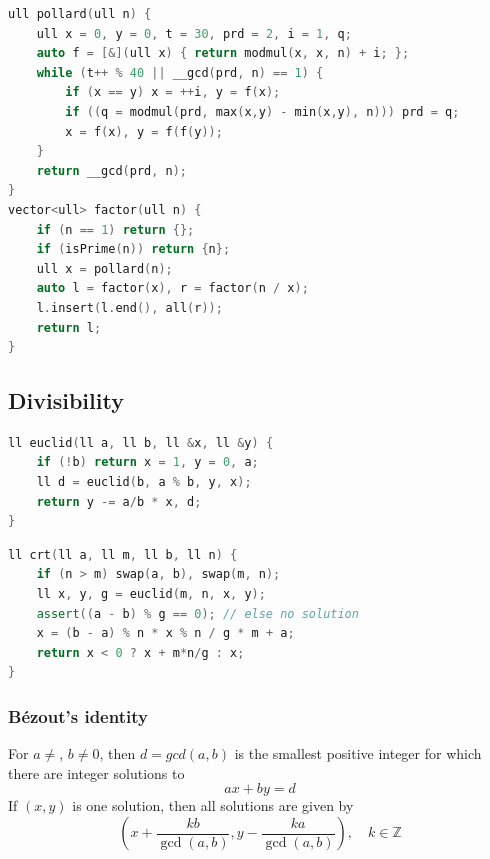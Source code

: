 \begin{multicols}{\Columns}
\begin{lstlisting}[language=C++]
ull pollard(ull n) {
	ull x = 0, y = 0, t = 30, prd = 2, i = 1, q;
	auto f = [&](ull x) { return modmul(x, x, n) + i; };
	while (t++ % 40 || __gcd(prd, n) == 1) {
		if (x == y) x = ++i, y = f(x);
		if ((q = modmul(prd, max(x,y) - min(x,y), n))) prd = q;
		x = f(x), y = f(f(y));
	}
	return __gcd(prd, n);
}
vector<ull> factor(ull n) {
	if (n == 1) return {};
	if (isPrime(n)) return {n};
	ull x = pollard(n);
	auto l = factor(x), r = factor(n / x);
	l.insert(l.end(), all(r));
	return l;
}
\end{lstlisting}


\subsection{Divisibility}
\begin{lstlisting}[language=C++]
ll euclid(ll a, ll b, ll &x, ll &y) {
	if (!b) return x = 1, y = 0, a;
	ll d = euclid(b, a % b, y, x);
	return y -= a/b * x, d;
}
\end{lstlisting}

\begin{lstlisting}[language=C++]
ll crt(ll a, ll m, ll b, ll n) {
	if (n > m) swap(a, b), swap(m, n);
	ll x, y, g = euclid(m, n, x, y);
	assert((a - b) % g == 0); // else no solution
	x = (b - a) % n * x % n / g * m + a;
	return x < 0 ? x + m*n/g : x;
}
\end{lstlisting}


	\subsubsection{Bézout's identity}
	For $a \neq $, $b \neq 0$, then $d=gcd(a,b)$ is the smallest positive integer for which there are integer solutions to
	$$ax+by=d$$
	If $(x,y)$ is one solution, then all solutions are given by
	$$\left(x+\frac{kb}{\gcd(a,b)}, y-\frac{ka}{\gcd(a,b)}\right), \quad k\in\mathbb{Z}$$


\end{multicols}
